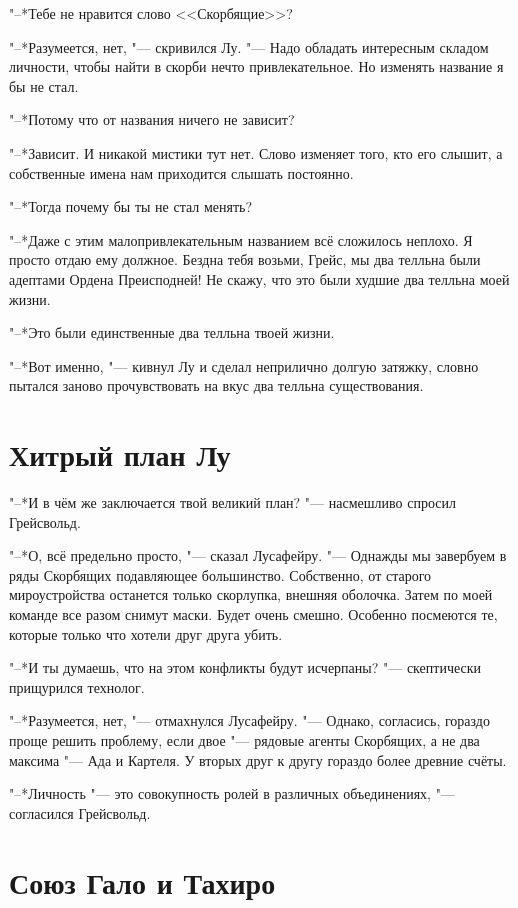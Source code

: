 \documentclass[a4paper,10pt]{book}
\begin{document}
"--*Тебе не нравится слово <<Скорбящие>>?

"--*Разумеется, нет, "--- скривился Лу. "--- Надо обладать интересным складом 
личности, чтобы найти в скорби нечто привлекательное. Но
изменять название я бы не стал.

"--*Потому что от названия ничего не зависит?

"--*Зависит. И никакой мистики тут нет. Слово изменяет того, кто его слышит, а 
собственные имена нам приходится слышать постоянно.

"--*Тогда почему бы ты не стал менять?

"--*Даже с этим малопривлекательным названием всё сложилось неплохо. Я просто 
отдаю ему должное. Бездна тебя возьми, Грейс, мы два телльна были адептами 
Ордена Преисподней!
Не скажу, что это были худшие два телльна моей жизни.

"--*Это были единственные два телльна твоей жизни.

"--*Вот именно, "--- кивнул Лу и сделал неприлично долгую затяжку, словно 
пытался заново
прочувствовать на вкус два телльна существования.

\section{Хитрый план Лу}

"--*И в чём же заключается твой великий план? "--- насмешливо спросил 
Грейсвольд.

"--*О, всё предельно просто, "--- сказал Лусафейру. "--- Однажды мы завербуем в 
ряды Скорбящих подавляющее большинство. Собственно, от старого мироустройства 
останется только скорлупка, внешняя оболочка. Затем по моей команде все разом 
снимут маски. Будет очень смешно. Особенно посмеются те, которые только что 
хотели друг друга убить.

"--*И ты думаешь, что на этом конфликты будут исчерпаны? "--- скептически 
прищурился технолог.

"--*Разумеется, нет, "--- отмахнулся Лусафейру. "--- Однако, согласись, гораздо 
проще решить проблему, если двое "--- рядовые агенты Скорбящих, а не два 
максима "--- Ада и Картеля. У вторых друг к другу гораздо более древние счёты.

"--*Личность "--- это совокупность ролей в различных объединениях, "--- 
согласился Грейсвольд.

\section{Союз Гало и Тахиро}
\end{document}
